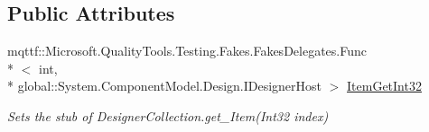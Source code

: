 \subsection*{Public Attributes}
\begin{DoxyCompactItemize}
\item 
mqttf\-::\-Microsoft.\-Quality\-Tools.\-Testing.\-Fakes.\-Fakes\-Delegates.\-Func\\*
$<$ int, \\*
global\-::\-System.\-Component\-Model.\-Design.\-I\-Designer\-Host $>$ \hyperlink{class_system_1_1_component_model_1_1_design_1_1_fakes_1_1_stub_designer_collection_a2171cb28cb3e5bc3b02cfda46d135ac9}{Item\-Get\-Int32}
\begin{DoxyCompactList}\small\item\em Sets the stub of Designer\-Collection.\-get\-\_\-\-Item(\-Int32 index)\end{DoxyCompactList}\end{DoxyCompactItemize}
